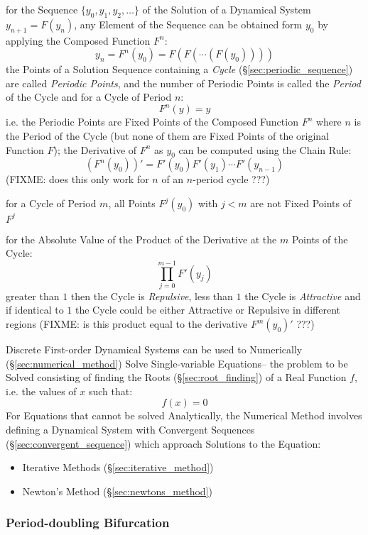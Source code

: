 for the Sequence $\{ y_0, y_1, y_2, \ldots \}$ of the Solution of a Dynamical
System $y_{n+1} = F(y_n)$, any Element of the Sequence can be obtained form
$y_0$ by applying the Composed Function $F^n$:
\[
  y_n = F^n(y_0) = F(F(\cdots(F(y_0))))
\]
the Points of a Solution Sequence containing a \emph{Cycle}
(\S\ref{sec:periodic_sequence}) are called \emph{Periodic Points}, and the
number of Periodic Points is called the \emph{Period} of the Cycle and for
a Cycle of Period $n$:
\[
  F^n(y) = y
\]
i.e. the Periodic Points are Fixed Points of the Composed Function $F^n$ where
$n$ is the Period of the Cycle (but none of them are Fixed Points of the
original Function $F$);
the Derivative of $F^n$ as $y_0$ can be computed using the Chain Rule:
\[
  (F^n(y_0))' = F'(y_0)F'(y_1)\cdots{F'(y_{n-1})}
\]
(FIXME: does this only work for $n$ of an $n$-period cycle ???)

for a Cycle of Period $m$, all Points $F^j(y_0)$ with $j < m$ are not Fixed
Points of $F^j$

for the Absolute Value of the Product of the Derivative at the $m$ Points of the
Cycle:
\[
  \prod_{j=0}^{m-1} F'(y_j)
\]
greater than $1$ then the Cycle is \emph{Repulsive}, less than $1$ the Cycle is
\emph{Attractive} and if identical to $1$ the Cycle could be either Attractive
or Repulsive in different regions
(FIXME: is this product equal to the derivative $F^m(y_0)'$ ???)

Discrete First-order Dynamical Systems can be used to Numerically
(\S\ref{sec:numerical_method}) Solve Single-variable Equations-- the problem to
be Solved consisting of finding the Roots (\S\ref{sec:root_finding}) of a Real
Function $f$, i.e. the values of $x$ such that:
\[
  f(x) = 0
\]
For Equations that cannot be solved Analytically, the Numerical Method involves
defining a Dynamical System with Convergent Sequences
(\S\ref{sec:convergent_sequence}) which approach Solutions to the Equation:
\begin{itemize}
  \item Iterative Methods (\S\ref{sec:iterative_method})
  \item Newton's Method (\S\ref{sec:newtons_method})
\end{itemize}



\subsubsection{Period-doubling Bifurcation}\label{sec:period_doubling}

